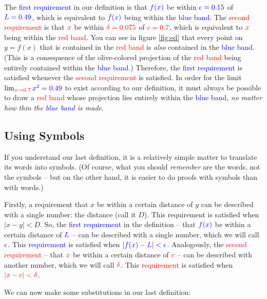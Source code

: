\documentclass{myarticle}
\newcommand{\hor}[1]{\textcolor{red}{#1}} %
\newcommand{\ver}[1]{\textcolor{blue}{#1}}
\newcommand{\olive}[1]{\textcolor{green!50!red}{#1}}
\theoremstyle{nospace}
\newtheorem{old series theorem}{Theorem}
\newenvironment{series theorem}{\begin{mdframed}\begin{old series theorem}}{\end{old series theorem}\end{mdframed}}
\begin{document}
The \ver{first requirement} in our definition is that $\ver{f(x)}$ be within $\ver{\epsilon = 0.15}$ of $\ver{L = 0.49}$, which is equivalent to $\ver{f(x)}$ being within the \ver{blue band}. The \hor{second requirement} is that $\hor{x}$ be within $\hor{\delta = 0.075}$ of $\hor{c = 0.7}$, which is equivalent to $\hor{x}$ being within the \hor{red band}. You can see in figure \ref{fig:ed} that every point on $y = f(x)$ that is contained in the \hor{red band} is \emph{also} contained in the \ver{blue band}. (This is a consequence of the \olive{olive-colored projection} of the \hor{red band} being entirely contained within the \ver{blue band}.) Therefore, the \ver{first requirement} is satisfied whenever the \hor{second requirement} is satisfied. In order for the limit $\lim_{\hor{x \to 0.7}} \ver{x^2} = \ver{0.49}$ to exist according to our definition, it must always be possible to draw a \hor{red band} whose \olive{projection} lies entirely within the \ver{blue band}, \emph{no matter how thin the \ver{blue band} is made}.

\subsection{Using Symbols} \label{sec:using symbols}

If you understand our last definition, it is a relatively simple matter to translate its words into symbols. (Of course, what you should \emph{remember} are the words, not the symbols -- but on the other hand, it is easier to do proofs with symbols than with words.)

Firstly, a requirement that $x$ be within a certain distance of $y$ can be described with a single number: the distance (call it $D$). This requirement is satisfied when $|x - y| < D$. So, the \ver{first requirement} in the definition -- that $\ver{f(x)}$ be within a certain distance of $\ver{L}$ -- can be described with a single number, which we will call $\ver{\epsilon}$. This \ver{requirement} is satisfied when $\ver{|f(x) - L| < \epsilon}$. Analogously, the \hor{second requirement} -- that $\hor{x}$ be within a certain distance of $\hor{c}$ -- can be described with another number, which we will call $\hor{\delta}$. This \hor{requirement} is satisfied when $\hor{|x - c| < \delta}$.

We can now make some substitutions in our last definition:
\end{document}
